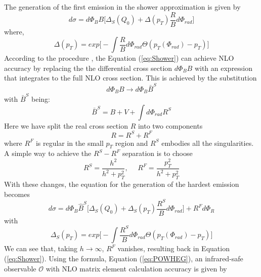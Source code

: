 \indent The generation of the first emission in the shower approximation is given by
\begin{equation}\label{eq:Shower}
    d\sigma = d\Phi_BB\bigg[\Delta_S(Q_0) + \Delta(p_T) \frac{R}{B}d\Phi_{rad}\bigg]
\end{equation}
where,
\begin{equation}
    \Delta(p_T) = exp\bigg[- \int\frac{R}{B}d\Phi_{rad}\Theta(p_T(\Phi_{rad})-p_T) \bigg]
\end{equation}
According to the {\selectfont{Powheg}} procedure \cite{Stefano_Frixione_2007}, the Equation (\ref{eq:Shower}) can achieve NLO accuracy by replacing the the differential cross section $d\Phi_B B$ with an expression that integrates to the full NLO cross section. This is achieved by the substitution
\begin{equation}
    d\Phi_B B \rightarrow d\Phi_B \bar{B}^S
\end{equation}
with $\bar{B}^S$ being:
\begin{equation} \label{eq:B_bar}
    \bar{B}^S = B + V + \int d\Phi_{rad}R^S   
\end{equation}
Here we have split the real cross section $R$ into two components
\begin{equation}\label{eq:Real_cross}
    R = R^S + R^F
\end{equation}
where $R^F$ is regular in the small $p_T$ region and $R^S$ embodies all the singularities. A simple way to achieve the $R^S-R^F$ separation is to choose
\begin{equation}
    R^S = \frac{h^2}{h^2+p_T^2}, \: \: \: \: \: \: R^F = \frac{p_T^2}{h^2+p_T^2}
\end{equation}
With these changes, the equation for the generation of the hardest emission becomes
\begin{equation}\label{eq:POWHEG}
    d\sigma = d\Phi_B \hat{B}^S \bigg[\Delta_S(Q_0) + \Delta_S(p_T) \frac{R^S}{B}d\Phi_{rad}\bigg] + R^Fd\Phi_R
\end{equation}
with
\begin{equation}
    \Delta_S(p_T) = exp \bigg[- \int \frac{R^S}{B}d\Phi_{rad}\Theta(p_T(\Phi_{rad})-p_T)\bigg]
\end{equation}
We can see that, taking $h \rightarrow \infty$, $R^F$ vanishes, resulting back in Equation (\ref{eq:Shower}). Using the {\selectfont{Powheg}} formula, Equation (\ref{eq:POWHEG}), an infrared-safe observable $\mathscr{O}$ with NLO matrix element calculation accuracy is given by 
